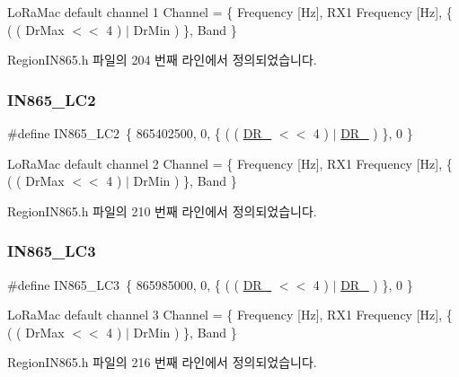 Lo\+Ra\+Mac default channel 1 Channel = \{ Frequency \mbox{[}Hz\mbox{]}, R\+X1 Frequency \mbox{[}Hz\mbox{]}, \{ ( ( Dr\+Max $<$$<$ 4 ) $\vert$ Dr\+Min ) \}, Band \} 

Region\+I\+N865.\+h 파일의 204 번째 라인에서 정의되었습니다.

\mbox{\label{group___r_e_g_i_o_n_i_n865_ga737c986f456a7cc50b7efcbae64da6a0}} 
\subsubsection{\texorpdfstring{I\+N865\+\_\+\+L\+C2}{IN865\_LC2}}
{\footnotesize\ttfamily \#define I\+N865\+\_\+\+L\+C2~\{ 865402500, 0, \{ ( ( \mbox{\hyperlink{group___r_e_g_i_o_n_ga872e12c82020c02a7f70a1c6ed1375df}{D\+R\+\_}} $<$$<$ 4 ) $\vert$ \mbox{\hyperlink{group___r_e_g_i_o_n_ga6c4ef966b4f3d5eb7597b087f2b97095}{D\+R\+\_}} ) \}, 0 \}}

Lo\+Ra\+Mac default channel 2 Channel = \{ Frequency \mbox{[}Hz\mbox{]}, R\+X1 Frequency \mbox{[}Hz\mbox{]}, \{ ( ( Dr\+Max $<$$<$ 4 ) $\vert$ Dr\+Min ) \}, Band \} 

Region\+I\+N865.\+h 파일의 210 번째 라인에서 정의되었습니다.

\mbox{\label{group___r_e_g_i_o_n_i_n865_ga6808f21aa6b28f6d31d32bc44c3ee52a}} 
\subsubsection{\texorpdfstring{I\+N865\+\_\+\+L\+C3}{IN865\_LC3}}
{\footnotesize\ttfamily \#define I\+N865\+\_\+\+L\+C3~\{ 865985000, 0, \{ ( ( \mbox{\hyperlink{group___r_e_g_i_o_n_ga872e12c82020c02a7f70a1c6ed1375df}{D\+R\+\_}} $<$$<$ 4 ) $\vert$ \mbox{\hyperlink{group___r_e_g_i_o_n_ga6c4ef966b4f3d5eb7597b087f2b97095}{D\+R\+\_}} ) \}, 0 \}}

Lo\+Ra\+Mac default channel 3 Channel = \{ Frequency \mbox{[}Hz\mbox{]}, R\+X1 Frequency \mbox{[}Hz\mbox{]}, \{ ( ( Dr\+Max $<$$<$ 4 ) $\vert$ Dr\+Min ) \}, Band \} 

Region\+I\+N865.\+h 파일의 216 번째 라인에서 정의되었습니다.

